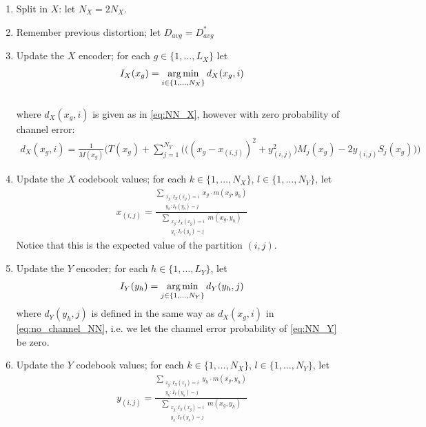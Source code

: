 \begin{enumerate}
    
    \item \label{init_split} Split in $X$: let $N_X=2N_X$.
    \item \label{init_start} Remember previous distortion; let $D_{avg}=D^*_{avg}$
    \item Update the $X$ encoder; for each $g\in\{1,\ldots,L_X\}$ let
    \begin{align}
        I_X(x_g) = \operatorname*{arg\,min}_{i \in \{1,\dots,N_X\}}d_X(x_g,i)
    \end{align}
    \\
    where $d_X(x_g,i)$ is given as in \eqref{eq:NN_X}, however with zero probability of channel error:
    \begin{align}
        \label{eq:no_channel_NN}
        d_X(x_g,i) =
            \frac{1}{M(x_g)} \bigg(T(x_g) + 
            \sum_{j=1}^{N_Y}
            \Big(\big({(x_g-x_{(i,j)})}^2 +
            y_{(i,j)}^2\big)M_j(x_g) -2y_{(i,j)}S_j(x_g)\Big)\bigg)
    \end{align}
    \item Update the $X$ codebook values; for each $k\in \{1,\ldots,N_X\}$, $l\in\{1,\ldots,N_Y\}$, let
    \begin{align}
        x_{(i,j)} = 
            \frac{\sum_{\substack{x_g:I_X(x_g)=i\\y_h:I_Y(y_h)=j}}x_g\cdot m(x_g,y_h)}
            {\sum_{\substack{x_g:I_X(x_g)=i\\y_h:I_Y(y_h)=j}}m(x_g,y_h)}
    \end{align}
    Notice that this is the expected value of the partition $(i,j)$.
    \item Update the $Y$ encoder; for each $h\in \{1,\ldots,L_Y\}$, let
    \begin{align}
        I_Y(y_h) = \operatorname*{arg\,min}_{j\in\{1,\ldots,N_Y\}}d_Y(y_h,j)
    \end{align}
    where $d_Y(y_h,j)$ is defined in the same way as $d_X(x_g,i)$ in \eqref{eq:no_channel_NN}, i.e. we let the channel error probability of \eqref{eq:NN_Y} be zero.
    \item Update the $Y$ codebook values; for each $k\in \{1,\ldots,N_X\}$, $l\in\{1,\ldots,N_Y\}$, let
    \begin{align}
        y_{(i,j)} = 
            \frac{\sum_{\substack{x_g:I_X(x_g)=i\\y_h:I_Y(y_h)=j}}y_h\cdot m(x_g,y_h)}
            {\sum_{\substack{x_g:I_X(x_g)=i\\y_h:I_Y(y_h)=j}}m(x_g,y_h)}

\end{align}
\end{enumerate}
